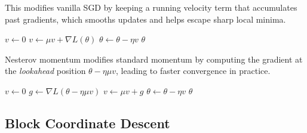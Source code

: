   \begin{algo}
    This modifies vanilla SGD by keeping a running velocity term that accumulates past gradients, which smooths updates and helps escape sharp local minima. 
    \begin{algorithm}[H]
    \label{alg:sgd_momentum}
    \begin{algorithmic}[1]  %

        \State $v \gets 0$ 
          \State $v \gets \mu v + \nabla L(\theta)$        
          \State $\theta \gets \theta - \eta v$
        \EndWhile
        \State \Return $\theta$
      \EndProcedure
    \end{algorithmic}
    \end{algorithm}
  \end{algo}

  \begin{algo}
    Nesterov momentum modifies standard momentum by computing the gradient at the \emph{lookahead} position $\theta - \eta \mu v$, leading to faster convergence in practice. 
    \begin{algorithm}[H]
    \label{alg:sgd_nesterov}
    \begin{algorithmic}[1]  %

        \State $v \gets 0$ 
          \State $g \gets \nabla L(\theta - \eta \mu v)$ 
          \State $v \gets \mu v + g$
          \State $\theta \gets \theta - \eta v$
        \EndWhile
        \State \Return $\theta$
      \EndProcedure
    \end{algorithmic}
    \end{algorithm}
  \end{algo}

\subsection{Block Coordinate Descent} 

